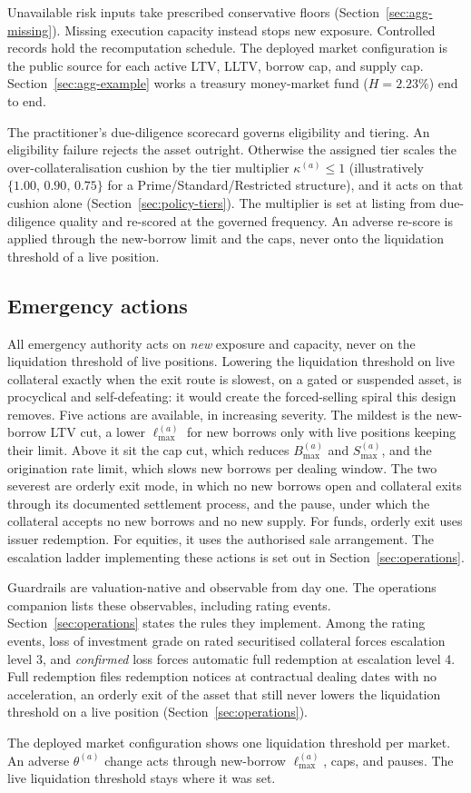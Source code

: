 Unavailable risk inputs take prescribed conservative floors (Section~\ref{sec:agg-missing}). Missing execution capacity instead stops new exposure. Controlled records hold the recomputation schedule. The deployed market configuration is the public source for each active LTV, LLTV, borrow cap, and supply cap. Section~\ref{sec:agg-example} works a treasury money-market fund ($H=2.23\%$) end to end.

The practitioner's due-diligence scorecard governs eligibility and tiering. An eligibility failure rejects the asset outright. Otherwise the assigned tier scales the over-collateralisation cushion by the tier multiplier $\kappa^{(a)}\le 1$ (illustratively $\{1.00,\,0.90,\,0.75\}$ for a Prime/Standard/Restricted structure), and it acts on that cushion alone (Section~\ref{sec:policy-tiers}). The multiplier is set at listing from due-diligence quality and re-scored at the governed frequency. An adverse re-score is applied through the new-borrow limit and the caps, never onto the liquidation threshold of a live position.

\subsection{Emergency actions}\label{sec:overview-emergency}
All emergency authority acts on \emph{new} exposure and capacity, never on the liquidation threshold of live positions. Lowering the liquidation threshold on live collateral exactly when the exit route is slowest, on a gated or suspended asset, is procyclical and self-defeating: it would create the forced-selling spiral this design removes. Five actions are available, in increasing severity. The mildest is the new-borrow LTV cut, a lower $\ell_{\max}^{(a)}$ for new borrows only with live positions keeping their limit. Above it sit the cap cut, which reduces $B_{\max}^{(a)}$ and $S_{\max}^{(a)}$, and the origination rate limit, which slows new borrows per dealing window. The two severest are orderly exit mode, in which no new borrows open and collateral exits through its documented settlement process, and the pause, under which the collateral accepts no new borrows and no new supply. For funds, orderly exit uses issuer redemption. For equities, it uses the authorised sale arrangement. The escalation ladder implementing these actions is set out in Section~\ref{sec:operations}.

Guardrails are valuation-native and observable from day one. The operations companion lists these observables, including rating events. Section~\ref{sec:operations} states the rules they implement. Among the rating events, loss of investment grade on rated securitised collateral forces escalation level 3, and \emph{confirmed} loss forces automatic full redemption at escalation level 4. Full redemption files redemption notices at contractual dealing dates with no acceleration, an orderly exit of the asset that still never lowers the liquidation threshold on a live position (Section~\ref{sec:operations}).

The deployed market configuration shows one liquidation threshold per market. An adverse $\theta^{(a)}$ change acts through new-borrow $\ell_{\max}^{(a)}$, caps, and pauses. The live liquidation threshold stays where it was set.
